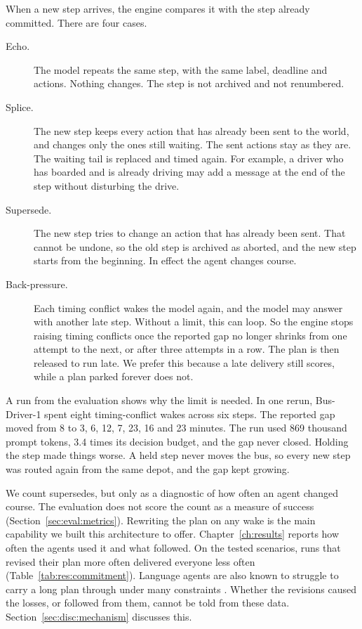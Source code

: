 When a new step arrives, the engine compares it with the step already
committed. There are four cases.

\begin{description}
  \item[Echo.] The model repeats the same step, with the same label, deadline
  and actions. Nothing changes. The step is not archived and not renumbered.
  \item[Splice.] The new step keeps every action that has already been sent to
  the world, and changes only the ones still waiting. The sent actions stay as
  they are. The waiting tail is replaced and timed again. For
  example, a driver who has boarded and is already driving may add a message at
  the end of the step without disturbing the drive.
  \item[Supersede.] The new step tries to change an action that has already
  been sent. That cannot be undone, so the old step is archived as aborted, and
  the new step starts from the beginning. In effect the agent changes course.
  \item[Back-pressure.] Each timing conflict wakes the model again, and the
  model may answer with another late step. Without a limit, this can loop. So
  the engine stops raising timing conflicts once the reported gap no longer
  shrinks from one attempt to the next, or after three attempts in a row. The
  plan is then released to run late. We prefer this because a late delivery
  still scores, while a plan parked forever does not.
\end{description}

A run from the evaluation shows why the limit is needed. In one rerun,
Bus-Driver-1 spent
eight timing-conflict wakes across six steps. The reported gap moved from 8 to
3, 6, 12, 7, 23, 16 and 23 minutes. The run used 869 thousand prompt tokens,
3.4 times its decision budget, and the gap never closed. Holding the step made
things worse. A held step never moves the bus, so every new step was routed again from
the same depot, and the gap kept growing.

We count supersedes, but only as a diagnostic of how often an agent changed
course. The evaluation does not score the count as a measure of success
(Section~\ref{sec:eval:metrics}). Rewriting the plan on any wake is the main
capability we built this architecture to offer.
Chapter~\ref{ch:results} reports how often the agents used it and what
followed. On the tested scenarios, runs that revised their plan more often
delivered everyone less often (Table~\ref{tab:res:commitment}). Language agents
are also known to struggle to carry a long plan through under many constraints
\parencite{xie2024a}. Whether the
revisions caused the losses, or followed from them, cannot be told from these
data. Section~\ref{sec:disc:mechanism} discusses this.

